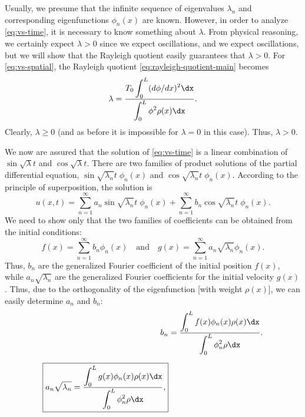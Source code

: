 Usually, we presume that the infinite sequence of eigenvalues $\lambda_n$ and corresponding eigenfunctions $\phi_n(x)$ are known.  However, in order to analyze \eqref{eq:vs-time}, it is necessary to know something about $\lambda$.  From physical reasoning, we certainly expect $\lambda > 0$ since we expect oscillations, and we expect oscillations, but we will show that the Rayleigh quotient easily guarantees that $\lambda > 0$.  For \eqref{eq:vs-spatial}, the Rayleigh quotient \eqref{eq:rayleigh-quotient-main} becomes
\begin{equation}
\label{eq:vs-rayleigh}
\lambda = \frac{\displaystyle T_0\int_0^L (d\phi/dx)^2\dx}{\displaystyle\int_0^L \phi^2\rho(x)\dx}.
\end{equation}
Clearly, $\lambda \ge 0$ (and as before it is impossible for $\lambda = 0$ in this case).  Thus, $\lambda > 0$.

We now are assured that the solution of \eqref{eq:vs-time} is a linear combination of $\sin\sqrt{\lambda}t$ and $\cos\sqrt{\lambda}t$.  There are two families of product solutions of the partial differential equation, $\sin\sqrt{\lambda_n}t\;\phi_n(x)$ and $\cos\sqrt{\lambda_n}t\;\phi_n(x)$.  According to the principle of superposition, the solution is
\begin{equation}
\label{eq:vs-solution}
\boxed{u(x,t) = \sum_{n=1}^{\infty} a_n\sin\sqrt{\lambda_n}t\;\phi_n(x) + \sum_{n=1}^{\infty} b_n\cos\sqrt{\lambda_n}t\;\phi_n(x).}
\end{equation}
We need to show only that the two families of coefficients can be obtained from the initial conditions:
\begin{equation}
\label{eq:vs-ic-expand}
f(x) = \sum_{n=1}^{\infty} b_n\phi_n(x) \quad \text{and} \quad g(x) = \sum_{n=1}^{\infty} a_n\sqrt{\lambda_n}\phi_n(x).
\end{equation}
Thus, $b_n$ are the generalized Fourier coefficient of the initial position $f(x)$, while $a_n\sqrt{\lambda_n}$ are the generalized Fourier coefficients for the initial velocity $g(x)$.  Thus, due to the orthogonality of the eigenfunction [with weight $\rho(x)$], we can easily determine $a_n$ and $b_n$:
\begin{align}
\label{eq:vs-bn}
b_n &= \frac{\displaystyle\int_0^L f(x)\phi_n(x)\rho(x)\dx}{\displaystyle\int_0^L \phi_n^2\rho\dx}. \\[6pt]
\label{eq:vs-an}
\boxed{a_n\sqrt{\lambda_n} = \frac{\displaystyle\int_0^L g(x)\phi_n(x)\rho(x)\dx}{\displaystyle\int_0^L \phi_n^2\rho\dx},}
\end{align}


